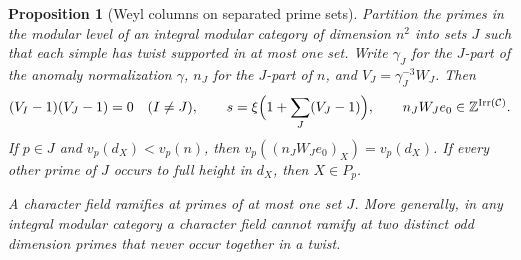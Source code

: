 \documentclass[11pt,a4paper]{article}
\numberwithin{equation}{section}
\newtheorem{proposition}[theorem]{Proposition}
\theoremstyle{remark}
\newcommand{\C}{\mathcal C}
\newcommand{\Irr}{\operatorname{Irr}}
\begin{document}
\begin{proposition}[Weyl columns on separated prime sets]\label{fam:M:6.2}\label{deep:cluster}\label{deep:separated-inertia}
Partition the primes in the modular level of an integral modular category
of dimension $n^2$ into sets $J$ such that each simple has twist
supported in at most one set. Write $\gamma_J$ for the $J$-part
of the anomaly normalization $\gamma$, $n_J$ for the $J$-part of
$n$, and $V_J=\gamma_J^{-3}W_J$. Then
\begin{equation}\label{eq:weylsplit}
   (V_I-1)(V_J-1)=0\quad(I\ne J),\qquad
   s=\xi\Bigl(1+\sum_J(V_J-1)\Bigr),\qquad
   n_J W_J e_0\in\mathbb Z^{\Irr(\C)} .
\end{equation}
If $p\in J$ and $v_p(d_X)<v_p(n)$, then
$v_p((n_J W_Je_0)_X)=v_p(d_X)$. If every other prime of $J$
occurs to full height in $d_X$, then $X\in P_p$.

A character field ramifies at primes of at most one set $J$. More
generally, in any integral modular category a character field cannot
ramify at two distinct odd dimension primes that never occur together
in a twist.
\end{proposition}
\end{document}
